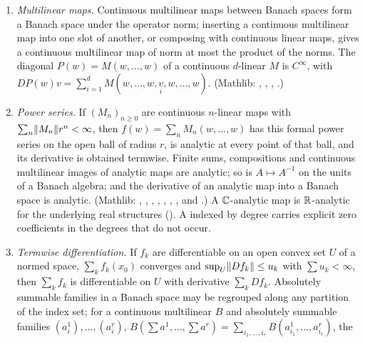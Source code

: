 \begin{enumerate}[label=(E\arabic*),leftmargin=*]
\item\label{bpW:w3:ext-multilinear} \emph{Multilinear maps.} Continuous multilinear maps between Banach spaces form a
  Banach space under the operator norm; inserting a continuous multilinear map into one slot of another, or composing
  with continuous linear maps, gives a continuous multilinear map of norm at most the product of the norms. The
  diagonal $P(w)=M(w,\dots,w)$ of a continuous $d$-linear $M$ is $C^\infty$, with
  $DP(w)v=\sum_{i=1}^dM(w,\dots,w,\underset{i}{v},w,\dots,w)$. (Mathlib: ,
  , ,
  .)
\item\label{bpW:w3:ext-series} \emph{Power series.} If $(M_n)_{n\ge0}$ are continuous $n$-linear maps with
  $\sum_n\lVert M_n\rVert r^n<\infty$, then $f(w)=\sum_nM_n(w,\dots,w)$ has this formal power series on the open ball of
  radius $r$, is analytic at every point of that ball, and its derivative is obtained termwise. Finite sums,
  compositions and continuous multilinear images of analytic maps are analytic; so is $A\mapsto A^{-1}$ on the units
  of a Banach algebra; and the derivative of an analytic map into a Banach space is analytic. (Mathlib:
  , , ,
  , , ,
  ,  and
  .) A $\mathbb{C}$-analytic map is $\mathbb{R}$-analytic for the
  underlying real structures (). A  indexed by
  degree carries explicit zero coefficients in the degrees that do not occur.
\item\label{bpW:w3:ext-tsum} \emph{Termwise differentiation.} If $f_k$ are differentiable on an open convex set $U$
  of a normed space, $\sum_kf_k(x_0)$ converges and $\sup_U\lVert Df_k\rVert\le u_k$ with $\sum u_k<\infty$, then
  $\sum_kf_k$ is differentiable on $U$ with derivative $\sum_kDf_k$. Absolutely summable families in a Banach space
  may be regrouped along any partition of the index set; for a continuous multilinear $B$ and absolutely summable
  families $(a^1_i),\dots,(a^r_i)$, $B(\sum a^1,\dots,\sum a^r)=\sum_{i_1,\dots,i_r}B(a^1_{i_1},\dots,a^r_{i_r})$, the

\end{enumerate}

